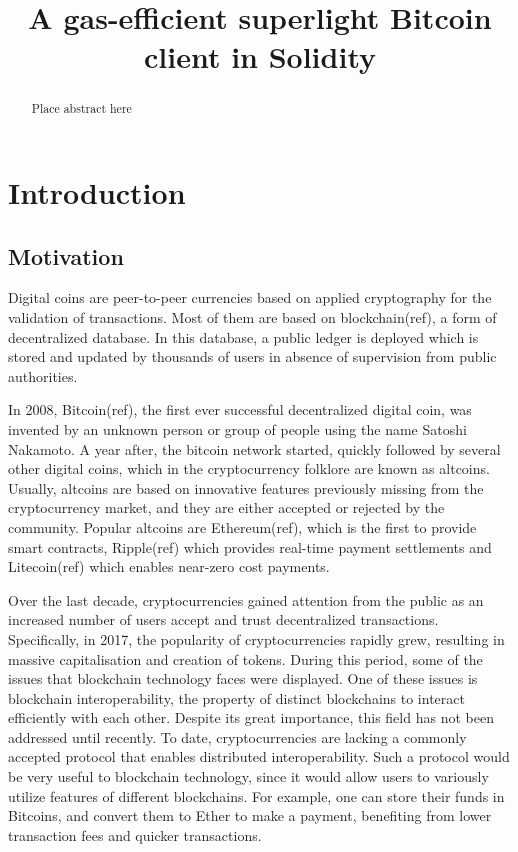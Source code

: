 \documentclass{article}
\title{A gas-efficient superlight Bitcoin client in Solidity}
\begin{document}
  \maketitle

  \begin{abstract}
    Place abstract here
  \end{abstract}

  \pagebreak

  \section{Introduction}

  \subsection{Motivation}

  Digital coins are peer-to-peer currencies based on applied
  cryptography for the validation of transactions. Most of them are
  based on blockchain(ref), a form of decentralized database. In this
  database, a public ledger is deployed which is stored and updated by
  thousands of users in absence of supervision from public authorities.

  In 2008, Bitcoin(ref), the first ever successful decentralized digital
  coin, was invented by an unknown person or group of people using the
  name Satoshi Nakamoto. A year after, the bitcoin network started,
  quickly followed by several other digital coins, which in the
  cryptocurrency folklore are known as altcoins. Usually, altcoins are
  based on innovative features previously missing from the
  cryptocurrency market, and they are either accepted or rejected by the
  community. Popular altcoins are Ethereum(ref), which is the first to
  provide smart contracts, Ripple(ref) which provides real-time payment
  settlements and Litecoin(ref) which enables near-zero cost payments.

  Over the last decade, cryptocurrencies gained attention from the
  public as an increased number of users accept and trust decentralized
  transactions. Specifically, in 2017, the popularity of
  cryptocurrencies rapidly grew, resulting in massive capitalisation and
  creation of tokens. During this period, some of the issues that
  blockchain technology faces were displayed. One of these issues is
  blockchain interoperability, the property of distinct blockchains to
  interact efficiently with each other. Despite its great importance,
  this field has not been addressed until recently. To date,
  cryptocurrencies are lacking a commonly accepted protocol that enables
  distributed interoperability. Such a protocol would be very useful to
  blockchain technology, since it would allow users to variously utilize
  features of different blockchains. For example, one can store their
  funds in Bitcoins, and convert them to Ether to make a payment,
  benefiting from lower transaction fees and quicker transactions.
\end{document}
